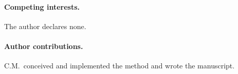 \documentclass[11pt,a4paper]{article}
\begin{document}
\paragraph{Competing interests.} The author declares none.

\paragraph{Author contributions.} C.M.\ conceived and implemented the method
and wrote the manuscript.



\end{document}
